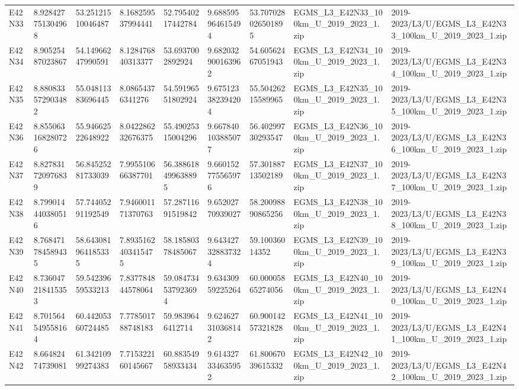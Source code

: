 \begin{landscape}
\begin{longtable}{lllllllll}
E42N33 & 8.928427751304968 & 53.25121510046487 & 8.168259537994441 & 52.79540217442784 & 9.688595964615494 & 53.707028026501895 & EGMS\_L3\_E42N33\_100km\_U\_2019\_2023\_1.zip & 2019-2023/L3/U/EGMS\_L3\_E42N33\_100km\_U\_2019\_2023\_1.zip \\
E42N34 & 8.90525487023867 & 54.14966247990591 & 8.128476840313377 & 53.6937002892924 & 9.682032900163962 & 54.60562467051943 & EGMS\_L3\_E42N34\_100km\_U\_2019\_2023\_1.zip & 2019-2023/L3/U/EGMS\_L3\_E42N34\_100km\_U\_2019\_2023\_1.zip \\
E42N35 & 8.880833572903482 & 55.04811383696445 & 8.08654376341276 & 54.59196551802924 & 9.675123382394204 & 55.50426215589965 & EGMS\_L3\_E42N35\_100km\_U\_2019\_2023\_1.zip & 2019-2023/L3/U/EGMS\_L3\_E42N35\_100km\_U\_2019\_2023\_1.zip \\
E42N36 & 8.855063168280726 & 55.94662522648922 & 8.042286232676375 & 55.49025315004296 & 9.667840103885077 & 56.40299730293547 & EGMS\_L3\_E42N36\_100km\_U\_2019\_2023\_1.zip & 2019-2023/L3/U/EGMS\_L3\_E42N36\_100km\_U\_2019\_2023\_1.zip \\
E42N37 & 8.827831720976839 & 56.84525281733039 & 7.995510666387701 & 56.388618499638895 & 9.660152775565976 & 57.30188713502189 & EGMS\_L3\_E42N37\_100km\_U\_2019\_2023\_1.zip & 2019-2023/L3/U/EGMS\_L3\_E42N37\_100km\_U\_2019\_2023\_1.zip \\
E42N38 & 8.799014440380516 & 57.74405291192549 & 7.946001171370763 & 57.28711691519842 & 9.65202770939027 & 58.20098890865256 & EGMS\_L3\_E42N38\_100km\_U\_2019\_2023\_1.zip & 2019-2023/L3/U/EGMS\_L3\_E42N38\_100km\_U\_2019\_2023\_1.zip \\
E42N39 & 8.768471784589435 & 58.643081964185335 & 7.8935162403415475 & 58.18580378485067 & 9.643427328837324 & 59.10036014352 & EGMS\_L3\_E42N39\_100km\_U\_2019\_2023\_1.zip & 2019-2023/L3/U/EGMS\_L3\_E42N39\_100km\_U\_2019\_2023\_1.zip \\
E42N40 & 8.736047218415353 & 59.54239659533213 & 7.837784844578064 & 59.084734537923694 & 9.63430959225264 & 60.00005865274056 & EGMS\_L3\_E42N40\_100km\_U\_2019\_2023\_1.zip & 2019-2023/L3/U/EGMS\_L3\_E42N40\_100km\_U\_2019\_2023\_1.zip \\
E42N41 & 8.701564549558164 & 60.44205360724485 & 7.778501788748183 & 59.9839646412714 & 9.624627310368142 & 60.90014257321828 & EGMS\_L3\_E42N41\_100km\_U\_2019\_2023\_1.zip & 2019-2023/L3/U/EGMS\_L3\_E42N41\_100km\_U\_2019\_2023\_1.zip \\
E42N42 & 8.66482474739081 & 61.34210999274383 & 7.715322160145667 & 60.88354958933434 & 9.614327334635952 & 61.80067039615332 & EGMS\_L3\_E42N42\_100km\_U\_2019\_2023\_1.zip & 2019-2023/L3/U/EGMS\_L3\_E42N42\_100km\_U\_2019\_2023\_1.zip \\

\end{longtable}
\end{landscape}
